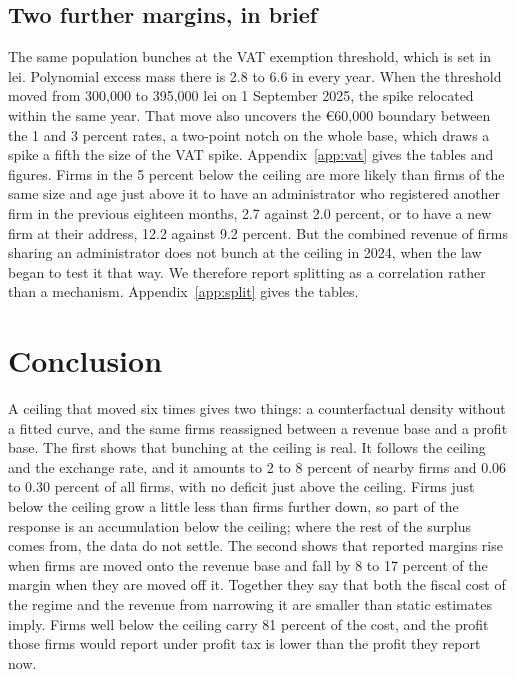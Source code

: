\documentclass[12pt]{article}
\begin{document}



\subsection{Two further margins, in brief}

The same population bunches at the VAT exemption threshold, which is set in lei. Polynomial excess mass there is 2.8 to 6.6 in every year. When the threshold moved from 300,000 to 395,000 lei on 1 September 2025, the spike relocated within the same year. That move also uncovers the \euro{}60,000 boundary between the 1 and 3 percent rates, a two-point notch on the whole base, which draws a spike a fifth the size of the VAT spike. Appendix~\ref{app:vat} gives the tables and figures. Firms in the 5 percent below the ceiling are more likely than firms of the same size and age just above it to have an administrator who registered another firm in the previous eighteen months, 2.7 against 2.0 percent, or to have a new firm at their address, 12.2 against 9.2 percent. But the combined revenue of firms sharing an administrator does not bunch at the ceiling in 2024, when the law began to test it that way. We therefore report splitting as a correlation rather than a mechanism. Appendix~\ref{app:split} gives the tables.

\FloatBarrier
\section{Conclusion}\label{sec:conc}

A ceiling that moved six times gives two things: a counterfactual density without a fitted curve, and the same firms reassigned between a revenue base and a profit base. The first shows that bunching at the ceiling is real. It follows the ceiling and the exchange rate, and it amounts to 2 to 8 percent of nearby firms and 0.06 to 0.30 percent of all firms, with no deficit just above the ceiling. Firms just below the ceiling grow a little less than firms further down, so part of the response is an accumulation below the ceiling; where the rest of the surplus comes from, the data do not settle. The second shows that reported margins rise when firms are moved onto the revenue base and fall by 8 to 17 percent of the margin when they are moved off it. Together they say that both the fiscal cost of the regime and the revenue from narrowing it are smaller than static estimates imply. Firms well below the ceiling carry 81 percent of the cost, and the profit those firms would report under profit tax is lower than the profit they report now.
\end{document}
